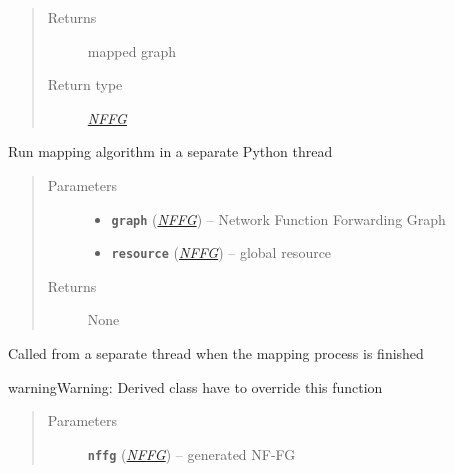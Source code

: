 \documentclass[letterpaper,10pt,english]{sphinxmanual}
\begin{document}
\begin{fulllineitems}
\begin{fulllineitems}
\begin{quote}
\begin{description}
\item[{Returns}] \leavevmode
mapped graph

\item[{Return type}] \leavevmode
{\hyperref[util/nffg:escape.util.nffg.NFFG]{\emph{NFFG}}}

\end{description}\end{quote}

\end{fulllineitems}


\begin{fulllineitems}
\label{util/mapping:escape.util.mapping.AbstractMapper._start_mapping}
Run mapping algorithm in a separate Python thread
\begin{quote}\begin{description}
\item[{Parameters}] \leavevmode\begin{itemize}
\item {} 
\textbf{\texttt{graph}} ({\hyperref[util/nffg:escape.util.nffg.NFFG]{\emph{\emph{NFFG}}}}) -- Network Function Forwarding Graph

\item {} 
\textbf{\texttt{resource}} ({\hyperref[util/nffg:escape.util.nffg.NFFG]{\emph{\emph{NFFG}}}}) -- global resource

\end{itemize}

\item[{Returns}] \leavevmode
None

\end{description}\end{quote}

\end{fulllineitems}


\begin{fulllineitems}
\label{util/mapping:escape.util.mapping.AbstractMapper._mapping_finished}
Called from a separate thread when the mapping process is finished

\begin{notice}{warning}{Warning:}
Derived class have to override this function
\end{notice}
\begin{quote}\begin{description}
\item[{Parameters}] \leavevmode
\textbf{\texttt{nffg}} ({\hyperref[util/nffg:escape.util.nffg.NFFG]{\emph{\emph{NFFG}}}}) -- generated NF-FG


\end{description}
\end{quote}
\end{fulllineitems}
\end{fulllineitems}
\end{document}
